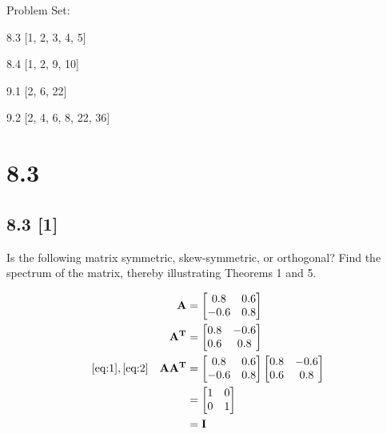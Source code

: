 \documentclass{article}
\begin{document}
{\large \noindent Problem Set:}

\par 8.3 [1, 2, 3, 4, 5]
\par 8.4 [1, 2, 9, 10]
\par 9.1 [2, 6, 22]
\par 9.2 [2, 4, 6, 8, 22, 36]
\vspace{5mm}

\noindent \hrulefill

\section*{8.3}
\setcounter{equation}{0}

\subsection*{8.3 [1]}
\setcounter{equation}{0}

Is the following matrix symmetric, skew-symmetric, or orthogonal?  Find the spectrum of the matrix, thereby illustrating Theorems 1 and 5.

\begin{align}
    \label{eq:1}
    && \textbf{A} &= \begin{bmatrix} 
    0.8 & 0.6 \\
    -0.6 & 0.8
    \end{bmatrix}
    \\
    \label{eq:2}
    && \textbf{A\textsuperscript{T}} &= \begin{bmatrix}
    0.8 & -0.6\\
    0.6 & 0.8
    \end{bmatrix}
    \\
    \label{eq:3}
    \eqref{eq:1}, \eqref{eq:2} && \textbf{AA\textsuperscript{T}} &= \begin{bmatrix}
    0.8 & 0.6 \\
    -0.6 & 0.8
    \end{bmatrix} \begin{bmatrix}
    0.8 & -0.6 \\
    0.6 & 0.8
    \end{bmatrix}
    \\
    \label{eq:4}
    && &= \begin{bmatrix}
    1 & 0\\
    0 & 1
    \end{bmatrix}
    \\
    \label{eq:5}
    && &= \textbf{I}
\end{align}
\end{document}
